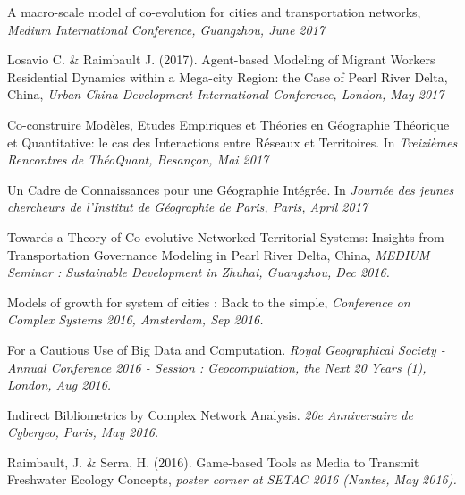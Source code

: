 \bigskip


\noindent A macro-scale model of co-evolution for cities and transportation networks, \textit{Medium International Conference, Guangzhou, June 2017}


\bigskip

\noindent Losavio C. \& Raimbault J. (2017). Agent-based Modeling of Migrant Workers Residential Dynamics within a Mega-city Region: the Case of Pearl River Delta, China, \textit{Urban China Development International Conference, London, May 2017}


\bigskip

\noindent Co-construire Modèles, Etudes Empiriques et Théories en Géographie Théorique et Quantitative: le cas des Interactions entre Réseaux et Territoires. In \textit{Treizièmes Rencontres de ThéoQuant, Besançon, Mai 2017}


\bigskip

\noindent Un Cadre de Connaissances pour une Géographie Intégrée. In \textit{Journée des jeunes chercheurs de l'Institut de Géographie de Paris, Paris, April 2017}


\bigskip


\noindent Towards a Theory of Co-evolutive Networked Territorial Systems: Insights from Transportation Governance Modeling in Pearl River Delta, China, \textit{MEDIUM Seminar : Sustainable Development in Zhuhai, Guangzhou, Dec 2016.}


\bigskip


\noindent Models of growth for system of cities : Back to the simple, \textit{Conference on Complex Systems 2016, Amsterdam, Sep 2016.}





\bigskip

\noindent For a Cautious Use of Big Data and Computation. \textit{Royal Geographical Society - Annual Conference 2016 - Session : Geocomputation, the Next 20 Years (1), London, Aug 2016.}


\bigskip

\noindent Indirect Bibliometrics by Complex Network Analysis. \textit{20e Anniversaire de Cybergeo, Paris, May 2016.}


\bigskip

\noindent Raimbault, J. \& Serra, H. (2016). Game-based Tools as Media to Transmit Freshwater Ecology Concepts, \textit{poster corner at SETAC 2016 (Nantes, May 2016).}


